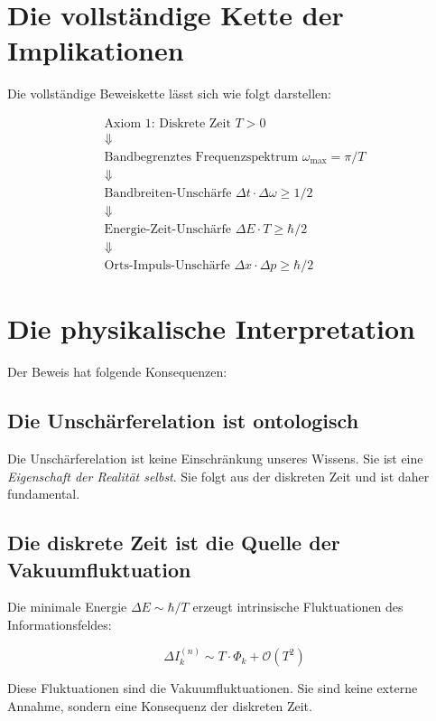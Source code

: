 \section{Die vollständige Kette der Implikationen}
\label{app:unschaerfe_kette}

Die vollständige Beweiskette lässt sich wie folgt darstellen:

\[
\boxed{
\begin{array}{c}
\text{Axiom 1: Diskrete Zeit } T > 0 \\
\Downarrow \\
\text{Bandbegrenztes Frequenzspektrum } \omega_{\max} = \pi/T \\
\Downarrow \\
\text{Bandbreiten-Unschärfe } \Delta t \cdot \Delta \omega \ge 1/2 \\
\Downarrow \\
\text{Energie-Zeit-Unschärfe } \Delta E \cdot T \ge \hbar/2 \\
\Downarrow \\
\text{Orts-Impuls-Unschärfe } \Delta x \cdot \Delta p \ge \hbar/2
\end{array}
}
\]

\section{Die physikalische Interpretation}
\label{app:unschaerfe_interpretation}

Der Beweis hat folgende Konsequenzen:

\subsection{Die Unschärferelation ist ontologisch}

Die Unschärferelation ist keine Einschränkung unseres Wissens. Sie ist eine \emph{Eigenschaft der Realität selbst}. Sie folgt aus der diskreten Zeit und ist daher fundamental.

\subsection{Die diskrete Zeit ist die Quelle der Vakuumfluktuation}

Die minimale Energie $\Delta E \sim \hbar/T$ erzeugt intrinsische Fluktuationen des Informationsfeldes:

\[
\Delta I_k^{(n)} \sim T \cdot \Phi_k + \mathcal{O}(T^2)
\]

Diese Fluktuationen sind die Vakuumfluktuationen. Sie sind keine externe Annahme, sondern eine Konsequenz der diskreten Zeit.

